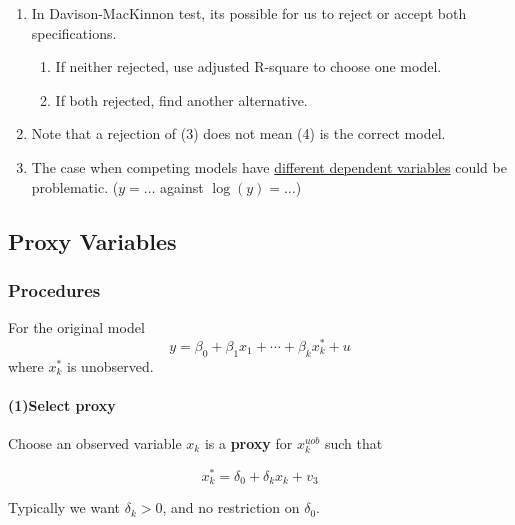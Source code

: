 \documentclass[]{article}
\begin{document}
			\begin{remark}[Porblems] \quad
				\begin{enumerate}
					\item In Davison-MacKinnon test, its possible for us to reject or accept both specifications.
					\begin{enumerate}
						\item If neither rejected, use adjusted R-square to choose one model.
						\item If both rejected, find another alternative.
					\end{enumerate}
					\item Note that a rejection of (3) does not mean (4) is the correct model.
					\item The case when competing models have \ul{different dependent variables} could be problematic. ($y = \dots $ against $\log(y) = \dots$)
				\end{enumerate}
			\end{remark}
		\subsection{Proxy Variables}
			\subsubsection{Procedures}
				\par For the original model
				\begin{equation}
					y = \beta_0 + \beta_1 x_1 + \cdots + \beta_k x_k^{*} + u
				\end{equation}
				where $x_k^{*}$ is unobserved. \\
				
				\paragraph{(1)Select proxy} Choose an observed variable $x_k$ is a \textbf{proxy} for $x_k^{uob}$ such that
				
				\begin{equation}
					x_k^{*} = \delta_0 + \delta_k x_k + v_3
				\end{equation}
				\begin{assumption}
					Typically we want $\delta_k > 0$, and no restriction on $\delta_0$.
				\end{assumption}
				
				
\end{document}
